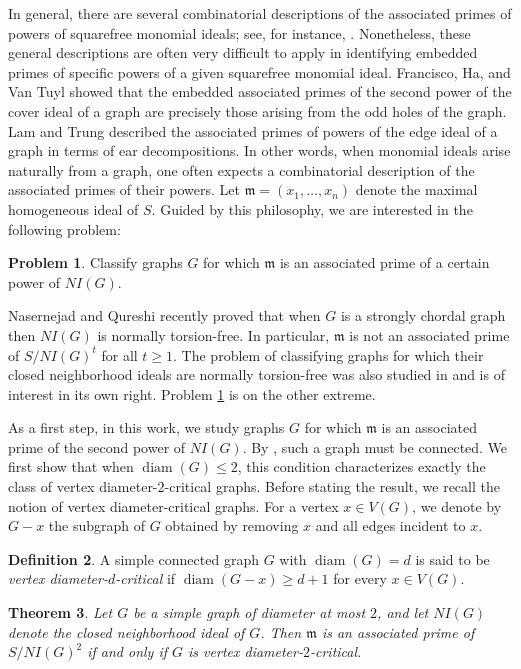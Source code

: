 \documentclass[12pt,reqno,twoside]{amsart}
\newcommand{\mm}{\mathfrak m}
\DeclareMathOperator{\diam}{diam}
\newtheorem{thm}{\bf Theorem}[section]
\theoremstyle{definition}
\newtheorem{defn}[thm]{\bf Definition}
\newtheorem{prob}[thm]{\bf Problem}
\theoremstyle{plain}
\theoremstyle{remark}
\numberwithin{equation}{section}
\begin{document}
In general, there are several combinatorial descriptions of the associated primes of powers of squarefree monomial ideals; see, for instance, \cite{BFT, FHV2, HM, TT}. Nonetheless, these general descriptions are often very difficult to apply in identifying embedded primes of specific powers of a given squarefree monomial ideal. Francisco, Ha, and Van Tuyl \cite{FHV1} showed that the embedded associated primes of the second power of the cover ideal of a graph are precisely those arising from the odd holes of the graph. Lam and Trung \cite{LT} described the associated primes of powers of the edge ideal of a graph in terms of ear decompositions. In other words, when monomial ideals arise naturally from a graph, one often expects a combinatorial description of the associated primes of their powers. Let $\mm = (x_1, \ldots, x_n)$ denote the maximal homogeneous ideal of $S$. Guided by this philosophy, we are interested in the following problem:


\begin{prob}\label{prob_a} Classify graphs $G$ for which $\mm$ is an associated prime of a certain power of $NI(G)$.    
\end{prob}

Nasernejad and Qureshi \cite{NQ} recently proved that when $G$ is a strongly chordal graph then $NI(G)$ is normally torsion-free. In particular, $\mm$ is not an associated prime of $S/NI(G)^t$ for all $t \ge 1$. The problem of classifying graphs for which their closed neighborhood ideals are normally torsion-free was also studied in \cite{NQBM} and is of interest in its own right. Problem \ref{prob_a} is on the other extreme. 


As a first step, in this work, we study graphs $G$ for which $\mm$ is an associated prime of the second power of $NI(G)$. By \cite[Theorem 1.1]{NV}, such a graph must be connected. We first show that when $\diam(G) \leq 2$, this condition characterizes exactly the class of vertex diameter-$2$-critical graphs. Before stating the result, we recall the notion of vertex diameter-critical graphs. For a vertex $x \in V(G)$, we denote by $G - x$ the subgraph of $G$ obtained by removing $x$ and all edges incident to $x$.


\begin{defn}
A simple connected graph $G$ with $\diam(G) = d$ is said to be \emph{vertex diameter-$d$-critical} if $\diam(G - x) \geq d + 1$ for every $x \in V(G)$.
\end{defn}


\begin{thm}\label{thm_diam_2}
Let $G$ be a simple graph of diameter at most $2$, and let $NI(G)$ denote the closed neighborhood ideal of $G$. Then $\mm$ is an associated prime of $S/NI(G)^2$ if and only if $G$ is vertex diameter-$2$-critical.
\end{thm}
\end{document}
